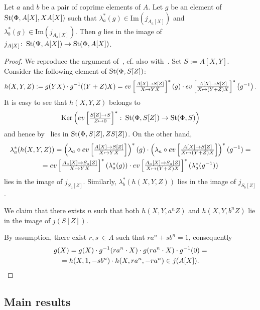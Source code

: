\begin{lemma}\label{lem:L25-2}
Let $a$ and $b$ be a pair of coprime elements of $A$.
Let $g$ be an element of $\St(\Phi, A[X], XA[X])$ such that
$\lambda_a^*(g) \in \mathrm{Im}(j_{A_a[X]})$ and $\lambda_b^*(g) \in \mathrm{Im}(j_{A_b[X]})$.
Then $g$ lies in the image of $j_{A[X]} \colon \St(\Psi, A[X]) \to \St(\Phi, A[X])$.
\end{lemma}
\begin{proof}
    We reproduce the argument of~\cite[Lemma~2.5]{Tu83}, cf. also with~\cite[Lemma~16]{S15}.
    Set $S := A[X, Y]$.
    Consider the following element of $\St(\Phi, S[Z])$:
    \[h(X, Y, Z) := g(YX) \cdot  g^{-1}((Y+Z) X) = \ev{A}{S[Z]}{YX}^* \left(g\right) \cdot \ev{A}{S[Z]}{(Y + Z)X}^*\left(g^{-1}\right).\]
    It is easy to see that $h(X, Y, Z)$ belongs to
    \[\Ker\left(\eval{Z}{S}{S}{0}^*\colon\St(\Phi, S[Z]) \rightarrow \St(\Phi, S)\right)\]
    and hence by~\cite[Lemma~8]{S15} lies in $\St(\Phi, S[Z], Z S[Z])$.
    On the other hand, \begin{multline*}
                           \lambda_{a}^*(h(X, Y, Z)) = \left(\lambda_a\circ \ev{A}{S[Z]}{Y X}\right)^*(g) \cdot \left(\lambda_a\circ \ev{A}{S[Z]}{(Y + Z)X}\right)^*(g^{-1}) = \\
                           = \ev{A_a}{S_a[Z]}{YX}^*(\lambda_{a}^*(g)) \cdot \ev{A_a}{S_a[Z]}{(Y + Z)X}^*(\lambda_{a}^*(g^{-1})) \end{multline*}
    lies in the image of $j_{S_a[Z]}$.
    Similarly, $\lambda_{b}^*(h(X, Y, Z))$ lies in the image of $j_{S_b[Z]}$.

    We claim that there exists $n$ such that both $h(X, Y, a^n Z)$ and $h(X, Y, b^n Z)$
    lie in the image of $j(S[Z])$.

    By assumption, there exist $r, s\ \in A$ such that $r a^n + s b^n = 1$, consequently
    \begin{multline*}
        g(X) = g(X)\cdot g^{-1}(ra^n\cdot X) \cdot g(ra^n\cdot X) \cdot g^{-1}(0) = \\ = h(X, 1, -sb^n) \cdot h(X, ra^n, -ra^n) \in j(A[X]). \qedhere
    \end{multline*} \end{proof}

\subsection{Main results}

